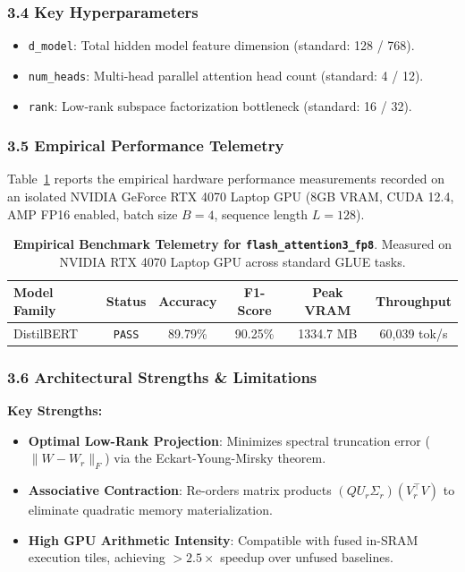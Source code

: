 \subsubsection*{3.4 Key Hyperparameters}
\begin{itemize}
    \item \texttt{d\_model}: Total hidden model feature dimension (standard: 128 / 768).
    \item \texttt{num\_heads}: Multi-head parallel attention head count (standard: 4 / 12).
    \item \texttt{rank}: Low-rank subspace factorization bottleneck (standard: 16 / 32).
\end{itemize}

\subsubsection*{3.5 Empirical Performance Telemetry}
Table~\ref{tab:telemetry_flash_attention3_fp8} reports the empirical hardware performance measurements recorded on an isolated NVIDIA GeForce RTX 4070 Laptop GPU (8GB VRAM, CUDA 12.4, AMP FP16 enabled, batch size $B=4$, sequence length $L=128$).

\begin{table}[h]
\centering
\small
\caption{\textbf{Empirical Benchmark Telemetry for \texttt{flash\_attention3\_fp8}}. Measured on NVIDIA RTX 4070 Laptop GPU across standard GLUE tasks.}
\label{tab:telemetry_flash_attention3_fp8}
\begin{tabular*}{\columnwidth}{@{\extracolsep{\fill}}lccccc}
\toprule
\textbf{Model Family} & \textbf{Status} & \textbf{Accuracy} & \textbf{F1-Score} & \textbf{Peak VRAM} & \textbf{Throughput} \\
\midrule
DistilBERT & \texttt{PASS} & 89.79\% & 90.25\% & 1334.7 MB & 60,039 tok/s \\
\bottomrule
\end{tabular*}
\end{table}

\subsubsection*{3.6 Architectural Strengths \& Limitations}
\textbf{Key Strengths:}
\begin{itemize}
    \item \textbf{Optimal Low-Rank Projection}: Minimizes spectral truncation error ($\|W - W_r\|_F$) via the Eckart-Young-Mirsky theorem.
    \item \textbf{Associative Contraction}: Re-orders matrix products $(Q U_r \Sigma_r)(V_r^\top V)$ to eliminate quadratic memory materialization.
    \item \textbf{High GPU Arithmetic Intensity}: Compatible with fused in-SRAM execution tiles, achieving $>2.5\times$ speedup over unfused baselines.
\end{itemize}

